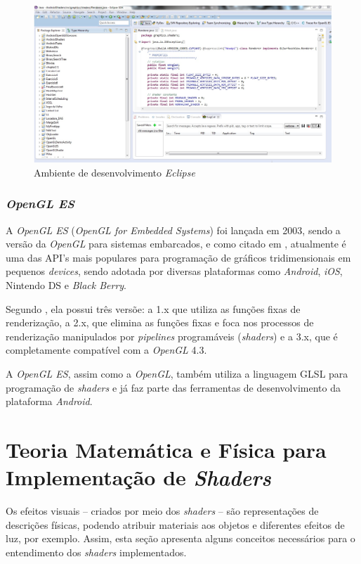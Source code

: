 	\begin{figure}[ht]
	\centering
		\includegraphics[keepaspectratio=true,scale=0.35]{figuras/eclipse.jpg}
	\caption{Ambiente de desenvolvimento \textit{Eclipse}}
	\label{eclipse}
	\end{figure}

	\subsubsection{\textit{OpenGL ES}}
	
	A \textit{OpenGL ES} (\textit{OpenGL for Embedded Systems}) foi lançada em 2003, sendo a versão da \textit{OpenGL} para sistemas embarcados, e como citado em \cite{guha2011}, atualmente é uma das API's mais populares para programação de gráficos tridimensionais em pequenos \textit{devices}, sendo adotada por diversas plataformas como \textit{Android}, \textit{iOS}, Nintendo DS e \textit{Black Berry}.

	Segundo \cite{opengles2012}, ela possui três versõe: a 1.x que utiliza as funções fixas de renderização, a 2.x, que elimina as funções fixas e foca nos processos de renderização manipulados por \textit{pipelines} programáveis (\textit{shaders}) e a 3.x, que é completamente compatível com a  \textit{OpenGL} 4.3.  

	A \textit{OpenGL ES}, assim como a \textit{OpenGL}, também utiliza a linguagem GLSL para programação de \textit{shaders} e  já faz parte das ferramentas de desenvolvimento da plataforma \textit{Android}. 


\section{Teoria Matemática e Física para Implementação de \textit{Shaders}}
\label{teoria}

	Os efeitos visuais -- criados por meio dos \textit{shaders} -- são representações de descrições físicas, podendo atribuir materiais aos objetos e diferentes efeitos de luz, por exemplo. Assim, esta seção apresenta alguns conceitos necessários para o entendimento dos \textit{shaders} implementados.

